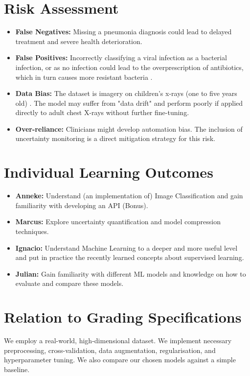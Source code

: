 \documentclass{article}
\begin{document}
\section{Risk Assessment}

\begin{itemize}
    \item \textbf{False Negatives:} Missing a pneumonia diagnosis could lead to delayed treatment and severe health deterioration.
    \item \textbf{False Positives:} Incorrectly classifying a viral infection as a bacterial infection, or as no infection could lead to the overprescription of antibiotics, which in turn causes more resistant bacteria \cite{Morrison2020-ef}. 
    \item \textbf{Data Bias:} The dataset is imagery on children's x-rays (one to five years old) \cite{kermany2018identifying}. The model may suffer from "data drift" and perform poorly if applied directly to adult chest X-rays without further fine-tuning.
    \item \textbf{Over-reliance:} Clinicians might develop automation bias. The inclusion of uncertainty monitoring is a direct mitigation strategy for this risk.
\end{itemize}

\section{Individual Learning Outcomes}

\begin{itemize}
    \item \textbf{Anneke:} Understand (an implementation of) Image Classification and gain familiarity with developing an API (Bonus).
    \item \textbf{Marcus:} Explore uncertainty quantification and model compression techniques.
    \item \textbf{Ignacio:} Understand Machine Learning to a deeper and more useful level and put in practice the recently learned concepts about supervised learning.
    \item \textbf{Julian:} Gain familiarity with different ML models and knowledge on how to evaluate and compare these models.
\end{itemize}

\section{Relation to Grading Specifications}
We employ a real-world, high-dimensional dataset. We implement necessary preprocessing, cross-validation, data augmentation, regularisation, and hyperparameter tuning. We also compare our chosen models against a simple baseline.
\end{document}
